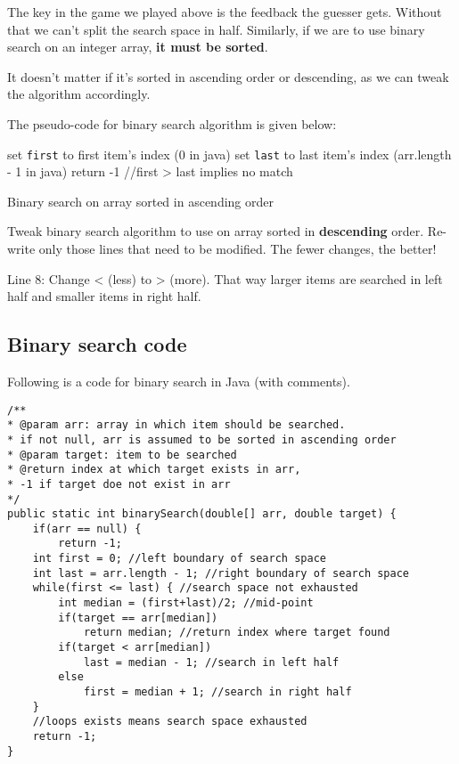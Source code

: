 The key in the game we played above is the feedback the guesser gets. Without that we can't split the search space in half.
Similarly, if we are to use binary search on an integer array, \textbf{it must be sorted}. 

It doesn't matter if it's sorted in ascending order or descending, as we can tweak the algorithm accordingly.

The pseudo-code for binary search algorithm is given below:

\IncMargin{1em}
\begin{algorithm}[H]
	\SetAlgoLined
{}
set \texttt{first} to first item's index (0 in java)\;
set \texttt{last} to last item's index (arr.length - 1 in java)\;
return -1 //first > last implies no match\;
\caption{Binary search on array sorted in ascending order \label{bs}}
\end{algorithm}

\begin{exercise}
Tweak binary search algorithm to use on array sorted in \textbf{descending} order. Re-write only those lines that need to be modified. The fewer changes, the better!
\end{exercise}
\begin{answer}
Line 8: Change < (less) to >	 (more). That way larger items are searched in left half and smaller items in right half.
\end{answer}

\newpage
\subsection{Binary search code}

Following is a code for binary search in Java (with comments).

\begin{lstlisting}[style=junit]
/**
* @param arr: array in which item should be searched.
* if not null, arr is assumed to be sorted in ascending order
* @param target: item to be searched
* @return index at which target exists in arr, 
* -1 if target doe not exist in arr
*/
public static int binarySearch(double[] arr, double target) {
	if(arr == null) {
		return -1;
	int first = 0; //left boundary of search space
	int last = arr.length - 1; //right boundary of search space
	while(first <= last) { //search space not exhausted
		int median = (first+last)/2; //mid-point
		if(target == arr[median])
			return median; //return index where target found
		if(target < arr[median])
			last = median - 1; //search in left half
		else
			first = median + 1; //search in right half
	}
	//loops exists means search space exhausted
	return -1;	
}
\end{lstlisting}


